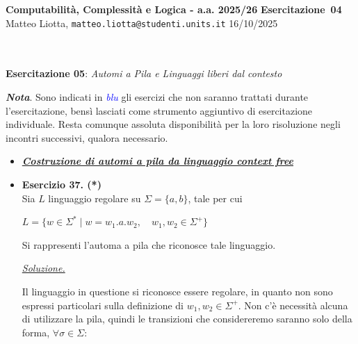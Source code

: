 \documentclass[a4paper,10pt]{article}
\makeatletter
\newcommand{\EsercitazioneNum}{04}
\newcommand{\Data}{16/10/2025}
\newcommand{\DocType}{Esercitazione} %
\newcommand{\FullTitle}{\DocType\ \EsercitazioneNum}
\newcommand{\Header}{
\noindent
  \small \textbf{Computabilità, Complessità e Logica - a.a. 2025/26} \hfill \textbf{\FullTitle} \\[0.2cm]
  \scriptsize Matteo Liotta, \texttt{matteo.liotta@studenti.units.it} \hfill \Data \\[0.2cm]
  \noindent\makebox[\linewidth]{\rule{\linewidth}{0.4pt}} \\[0.3cm]}
\makeatother
\begin{document}
\footnotesize  %
\Header\\[0.7cm]


\noindent\Large \textbf{Esercitazione 05}: \textit{Automi a Pila e Linguaggi liberi dal contesto}
\begin{osservazioni}
    \textbf{\textit{Nota}}. Sono indicati in \textcolor{blue}{\textit{blu}} gli esercizi che non saranno trattati durante l'esercitazione, bensì lasciati come strumento aggiuntivo di esercitazione individuale. Resta comunque assoluta disponibilità per la loro risoluzione negli incontri successivi, qualora necessario.
\end{osservazioni}

{\normalsize
\begin{itemize}[label=, leftmargin=0pt]

    \item \underline{\textit{\textbf{Costruzione di automi a pila da linguaggio context free}}}
    
    \item \textbf{Esercizio 37. (*)}\\ 
    Sia $L$ linguaggio regolare su $\Sigma=\{a,b\}$, tale per cui 
    {\begin{center}
        $L = \{ w\in \Sigma^* \mid w=w_1.a.w_2,\quad w_1, w_2\in \Sigma^+\}$\\
    \end{center}}
    Si rappresenti l'automa a pila che riconosce tale linguaggio.\\

    \begin{osservazioni}
    \underline{\textit{Soluzione.}}

    Il linguaggio in questione si riconosce essere regolare, in quanto non sono espressi particolari sulla definizione di $w_1,w_2 \in \Sigma^+ $. Non c'è necessità alcuna di utilizzare la pila, quindi le transizioni che considereremo saranno solo della forma, $\forall\sigma\in\Sigma$:

    {
    \small
    \begin{center}
\end{center}}
\end{osservazioni}
\end{itemize}}
\end{document}
